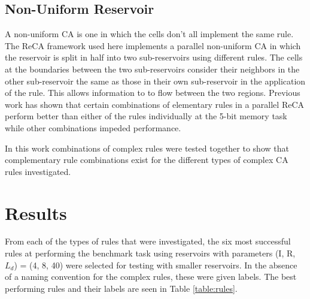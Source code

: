 \documentclass{facconf}
\begin{document}
\begin{multicols}{2}
\subsection{Non-Uniform Reservoir}
A non-uniform CA is one in which the cells don't all implement the same rule.  
The ReCA framework used here implements a parallel non-uniform CA in which the 
reservoir is split in half into two sub-reservoirs  using different rules.  The 
cells at the boundaries between  the two sub-reservoirs consider their 
neighbors in the other sub-reservoir the same as those in their own 
sub-reservoir in the application of the rule. This allows information to to 
flow between the two regions. Previous work has shown that certain combinations 
of elementary rules in a parallel ReCA perform better than either of the rules 
individually at the 5-bit memory task while other combinations impeded 
performance\cite{nichele2017reservoir}.  \par In this work combinations of 
complex rules were tested together to show that complementary rule combinations 
exist for the different types of complex CA rules investigated.  

\section{Results}\label{results}
From each of the types of rules that were investigated, the six most successful 
rules at performing the benchmark task using reservoirs with parameters (I, R, 
        $L_{d}$) = (4, 8, 40) were selected for testing with smaller  
reservoirs. In the absence of a naming convention for the complex rules, these 
were given labels. The best performing rules and their labels are seen in Table
\ref{table:rules}. \par


\end{multicols}
\end{document}
